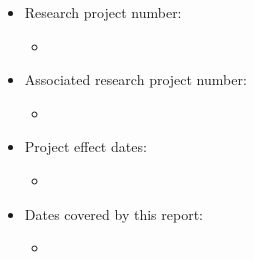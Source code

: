 {\begin{itemize}
          \ifdefined \numFAP
             \item Research project number:
             \begin{itemize}
                 \item[]\textbf{\numFAP} 
             \end{itemize}
          \fi  
          \ifdefined \numAssocFAP
          \item Associated research project number:
          \begin{itemize}
          	\item[]\textbf{\numAssocFAP} 
          \end{itemize}
          \fi  
       \item Project effect dates:
            \begin{itemize}
               \item[]\textbf{\periodRelat} 
            \end{itemize}
       \item Dates covered by this report:
            \begin{itemize}
               \item[]\textbf{\periodVig} 
            \end{itemize}
   \end{itemize}
   \clearpage
}


\newcommand\underrel[2]{\mathrel{\mathop{#2}\limits_{#1}}}

\newcommand{\matriz}[1]{\hat#1}

\newcommand{\many}[2]{$#1_1, #1_2, \dots, #1_#2$}

\newcommand{\cmany}[3]{$#1_1 #3 #1_2 #3 \dots #3 #1_#2$}

\newcommand{\mmany}[2]{ #1_1, #1_2, \dots, #1_#2 }

\newcommand{\mcmany}[3]{#1_1 #3 #1_2 #3 \dots #3 #1_#2}

\newcommand{\set}[1]{\{#1\}}

\newcommand{\cjgt}[1]{\overline{#1}}
\DeclareMathOperator{\sign}{sign}
\DeclareMathOperator{\Df}{D}
\DeclareMathOperator{\Ee}{E}
\DeclareMathOperator{\h}{h_1}
\DeclareMathOperator{\f}{f}
\DeclareMathOperator{\U}{U}
\DeclareMathOperator{\W}{W}
\DeclareMathOperator{\K}{K}
\DeclareMathOperator{\Hf}{\mathcal{H}}
\DeclareMathOperator{\Qf}{Q}
\DeclareMathOperator{\Gl}{\mathcal{L}}
\DeclareMathOperator{\g}{g}
\DeclareMathOperator{\V}{V}
\newcommand{\iu}{\mathrm{i}\mkern1mu}
\renewcommand{\Im}{\mathop{\textrm Im}}
\newcommand{\J}{J} %
\newcommand{\Id}{\mathds{1}}
\newcommand{\p}{\mathcal{P}} %
\newcommand{\Se}{\mathbb{S}}
\newcommand{\He}{\mathbb{H}}
 \newcommand{\E}{\mathbb{E}}

